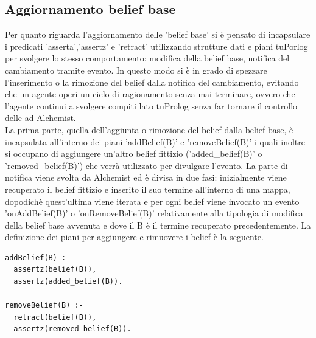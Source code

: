 \documentclass[12pt,a4paper,openright,twoside]{report}
\begin{document}
\subsection{Aggiornamento belief base}
Per quanto riguarda l'aggiornamento delle 'belief base' si \`e pensato di incapsulare i predicati 'asserta','assertz' e 'retract' utilizzando strutture dati e piani tuPorlog per svolgere lo stesso comportamento: modifica della belief base, notifica del cambiamento tramite evento. In questo modo si \`e in grado di spezzare l'inserimento o la rimozione del belief dalla notifica del cambiamento, evitando che un agente operi un ciclo di ragionamento senza mai terminare, ovvero che l'agente continui a svolgere compiti lato tuProlog senza far tornare il controllo delle ad Alchemist.
\\
La prima parte, quella dell'aggiunta o rimozione del belief dalla belief base, \`e incapsulata all'interno dei piani 'addBelief(B)' e 'removeBelief(B)' i quali inoltre si occupano di aggiungere un'altro belief fittizio ('added\_belief(B)' o 'removed\_belief(B)') che verr\`a utilizzato per divulgare l'evento.
La parte di notifica viene svolta da Alchemist ed \`e divisa in due fasi: inizialmente viene recuperato il belief fittizio e inserito il suo termine all'interno di una mappa, dopodich\`e quest'ultima viene iterata e per ogni belief viene invocato un evento 'onAddBelief(B)' o 'onRemoveBelief(B)' relativamente alla tipologia di modifica della belief base avvenuta e dove il B \`e il termine recuperato precedentemente.
La definizione dei piani per aggiungere e rimuovere i belief \`e la seguente.
\medskip
\begin{lstlisting}[firstnumber=1,caption={Piani per la gestione del bounding-box}]
addBelief(B) :-
  assertz(belief(B)),
  assertz(added_belief(B)).

removeBelief(B) :-
  retract(belief(B)),
  assertz(removed_belief(B)).
\end{lstlisting}
\end{document}
